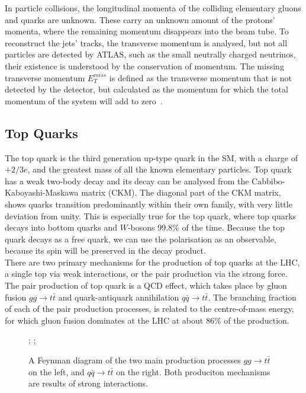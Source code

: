 \documentclass[12pt,a4paper]{article}
\numberwithin{equation}{section}
\begin{document}
In particle collisions, the longitudinal momenta of the colliding elementary
gluons and quarks are unknown. These carry an unknown amount of the protons'
momenta, where the remaining momentum disappears into the beam tube. To
reconstruct the jets' tracks, the transverse momentum is analysed, but not all
particles are detected by ATLAS, such as the small neutrally charged neutrinos,
their existence is understood by the conservation of momentum. The missing
transverse momentum $E_T^{miss}$ is defined as the transverse momentum that is
not detected by the detector, but calculated as the momentum for which the total
momentum of the system will add to zero~\cite{xabier}.

\subsection{Top Quarks}
The top quark is the third generation up-type quark in the SM, with a charge of
$+2/3 e$, and the greatest mass of all the known elementary particles. Top quark
has a weak two-body decay and its decay can be analysed from the
Cabbibo-Kaboyashi-Maskawa matrix (CKM). The diagonal part of the CKM matrix,
shows quarks transition predominantly within their own family, with very little
deviation from unity. This is especially true for the top quark, where top
quarks decays into bottom quarks and $W$-bosons 99.8\% of the time. Because the
top quark decays as a free quark, we can use the polarisation as an observable,
because its spin will be preserved in the decay product.\\

There are two primary mechanisms for the production of top quarks at the LHC, a
single top via weak interactions, or the pair production via the strong force.
The pair production of top quark is a QCD effect, which takes place by gluon
fusion $gg \rightarrow t\bar t$ and quark-antiquark annihilation $q\bar q \rightarrow t\bar t$. The
branching fraction of each of the pair production processes, is related to the
centre-of-mass energy, for which gluon fusion dominates at the LHC at about 86\%
of the production\cite{dasilva2016quark}.
\begin{figure}[H]
  \centering
  \hfill{}
  ;\hfill{}
  ;
  \hfill{}
	\caption{A Feynman diagram of the two main production processes $gg \rightarrow t\bar t$
    on the left, and $q\bar q \rightarrow t\bar t$ on the right. Both produciton
    mechanisms are results of strong interactions.}\label{fig:ttproduction}
\end{figure}
\end{document}
